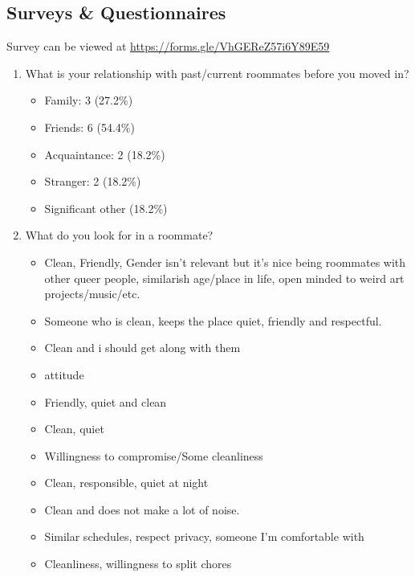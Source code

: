 \documentclass{article}
\begin{document}
\newpage
\appendix
\begin{appendices}
\section{Surveys \& Questionnaires}
Survey can be viewed at \url{https://forms.gle/VhGEReZ57i6Y89E59}
\begin{enumerate}
    \item What is your relationship with past/current roommates before you moved in?
    \begin{itemize}
        \item Family: 3 (27.2\%)
        \item Friends: 6 (54.4\%)
        \item Acquaintance: 2 (18.2\%)
        \item Stranger: 2 (18.2\%)
        \item Significant other (18.2\%)
    \end{itemize}

    \medskip
    \item{What do you look for in a roommate?}
    \begin{itemize}
        \item Clean, Friendly, Gender isn't relevant but it's nice being roommates with other queer 
        people, similarish age/place in life, open minded to weird art projects/music/etc.
        \item Someone who is clean, keeps the place quiet, friendly and respectful.
        \item Clean and i should get along with them
        \item attitude
        \item Friendly, quiet and clean 
        \item Clean, quiet
        \item Willingness to compromise/Some cleanliness 
        \item Clean, responsible, quiet at night
        \item Clean and does not make a lot of noise. 
        \item Similar schedules, respect privacy, someone I'm comfortable with
        \item Cleanliness, willingness to split chores
    \end{itemize}
    

\end{enumerate}
\end{appendices}
\end{document}
